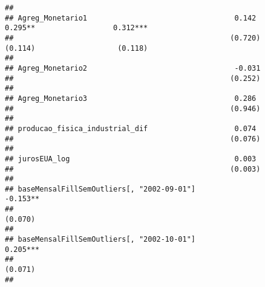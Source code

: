 \documentclass[
]{article}
\begin{document}
\begin{verbatim}
##                                                                                                                    
## Agreg_Monetario1                                  0.142                 0.295**                  0.312***          
##                                                  (0.720)                (0.114)                   (0.118)          
##                                                                                                                    
## Agreg_Monetario2                                  -0.031                                                           
##                                                  (0.252)                                                           
##                                                                                                                    
## Agreg_Monetario3                                  0.286                                                            
##                                                  (0.946)                                                           
##                                                                                                                    
## producao_fisica_industrial_dif                    0.074                                                            
##                                                  (0.076)                                                           
##                                                                                                                    
## jurosEUA_log                                      0.003                                                            
##                                                  (0.003)                                                           
##                                                                                                                    
## baseMensalFillSemOutliers[, "2002-09-01"]                                                        -0.153**          
##                                                                                                   (0.070)          
##                                                                                                                    
## baseMensalFillSemOutliers[, "2002-10-01"]                                                        0.205***          
##                                                                                                   (0.071)          
##                                                                                                                    

\end{verbatim}
\end{document}
